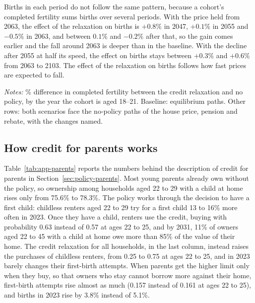 Births in each period do not follow the same pattern, because a cohort's
completed fertility sums births over several periods. With the price held from
2063, the effect of the relaxation on births is $+0.8\%$ in 2047, $+0.1\%$ in
2055 and $-0.5\%$ in 2063, and between $0.1\%$ and $-0.2\%$ after that, so
the gain comes earlier and the fall around 2063 is deeper than in the
baseline. With the decline after 2055 at half its speed, the effect on births
stays between $+0.3\%$ and $+0.6\%$ from 2063 to 2103. The effect of the
relaxation on births follows how fast prices are expected to fall.

\begin{table}[H]
\centering
\caption{Credit relaxation: completed fertility by cohort}
\label{tab:app-cohorts}
\small

\par\smallskip
\begin{minipage}{0.92\linewidth}
\footnotesize\textit{Notes:} \% difference in completed fertility between
the credit relaxation and no policy, by the year the cohort is aged 18--21.
Baseline: equilibrium paths. Other rows: both scenarios face the no-policy
paths of the house price, pension and rebate, with the changes named.
\end{minipage}
\end{table}

\subsection{How credit for parents works}
\label{app:policy-parents-mech}

Table~\ref{tab:app-parents} reports the numbers behind the description of
credit for parents in Section~\ref{sec:policy-parents}. Most young parents
already own without the policy, so ownership among households aged 22 to 29
with a child at home rises only from 75.6\% to 78.3\%. The policy works
through the decision to have a first child: childless renters aged 22 to 29
try for a first child 13 to 16\% more often in 2023. Once they have a child,
renters use the credit, buying with probability 0.63 instead of 0.57 at ages
22 to 25, and by 2031, 11\% of owners aged 22 to 45 with a child at home owe
more than 85\% of the value of their home. The credit relaxation for all
households, in the last column, instead raises the purchases of childless
renters, from 0.25 to 0.75 at ages 22 to 25, and in 2023 barely changes
their first-birth attempts. When parents get the higher limit only when they
buy, so that owners who stay cannot borrow more against their home, first-birth
attempts rise almost as much (0.157 instead of 0.161 at ages 22 to 25), and
births in 2023 rise by 3.8\% instead of 5.1\%.

